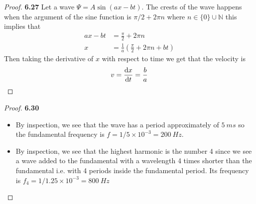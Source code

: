 \documentclass[11pt]{article}
\newcommand{\N}{\mathbb{N}}
\theoremstyle{definition}
\begin{document}
\begin{proof}{\textbf{6.27}}
    Let a wave $\Psi = A\sin(ax - bt)$. The crests of the wave happens
    when the argument of the sine function is $\pi/2 + 2\pi n$ where
    $n \in \{0\} \cup \N$ this implies that
    \begin{align*}
        ax - bt &= \frac{\pi}{2} + 2\pi n\\
        x &= \frac{1}{a}\left(\frac{\pi}{2} + 2\pi n + bt\right)
    \end{align*}
    Then taking the derivative of $x$ with respect to time we get that the
    velocity is
    \begin{align*}
        v = \dv{x}{t} = \frac{b}{a}
    \end{align*}
\end{proof}
\begin{proof}{\textbf{6.30}}
\begin{itemize}
    \item [(a)] By inspection, we see that the wave has a period approximately
    of $5~ms$ so the fundamental frequency is $f = 1/5\times 10^{-3} = 200~Hz$.
    \item [(b)] By inspection, we see that the highest harmonic is the number 4
    since we see a wave added to the fundamental with a wavelength 4 times
    shorter than the fundamental i.e. with 4 periods inside the fundamental
    period. Its frequency is $f_4 = 1/ 1.25 \times 10^{-3} = 800~Hz$
\end{itemize}
\end{proof}
\cleardoublepage
\end{document}
